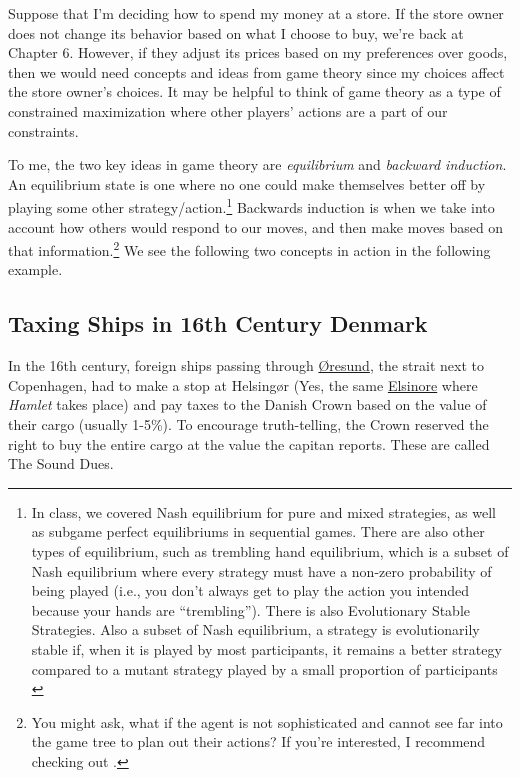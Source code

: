 Suppose that I'm deciding how to spend my money at a store. If the store owner does not change its behavior based on what I choose to buy, we're back at Chapter 6. However, if they adjust its prices based on my preferences over goods, then we would need concepts and ideas from game theory since my choices affect the store owner's choices. It may be helpful to think of game theory as a type of constrained maximization where other players' actions are a part of our constraints.

To me, the two key ideas in game theory are \textit{equilibrium} and \textit{backward induction}. An equilibrium state is one where no one could make themselves better off by playing some other strategy/action.\footnote{In class, we covered Nash equilibrium for pure and mixed strategies, as well as subgame perfect equilibriums in sequential games. There are also other types of equilibrium, such as trembling hand equilibrium, which is a subset of Nash equilibrium where every strategy must have a non-zero probability of being played (i.e., you don't always get to play the action you intended because your hands are ``trembling''). There is also Evolutionary Stable Strategies. Also a subset of Nash equilibrium, a strategy is evolutionarily stable if, when it is played by most participants, it remains a better strategy compared to a mutant strategy played by a small proportion of participants \citep{Broom_2013_Gamerbio}} Backwards induction is when we take into account how others would respond to our moves, and then make moves based on that information.\footnote{You might ask, what if the agent is not sophisticated and cannot see far into the game tree to plan out their actions? If you're interested, I recommend checking out \citet{li_2017_OSP}.} We see the following two concepts in action in the following example.

\subsection*{Taxing Ships in 16th Century Denmark \citep{Haan_2012_Taxation}}

In the 16th century, foreign ships passing through \href{https://www.google.com/maps?q=%C3%98resund&=Search%20Google%20Maps}{Øresund}, the strait next to Copenhagen, had to make a stop at Helsingør (Yes, the same \href{https://en.wikipedia.org/wiki/Hamlet}{Elsinore} where \textit{Hamlet} takes place) and pay taxes to the Danish Crown based on the value of their cargo (usually 1-5\%). To encourage truth-telling, the Crown reserved the right to buy the entire cargo at the value the capitan reports. These are called The Sound Dues. 

